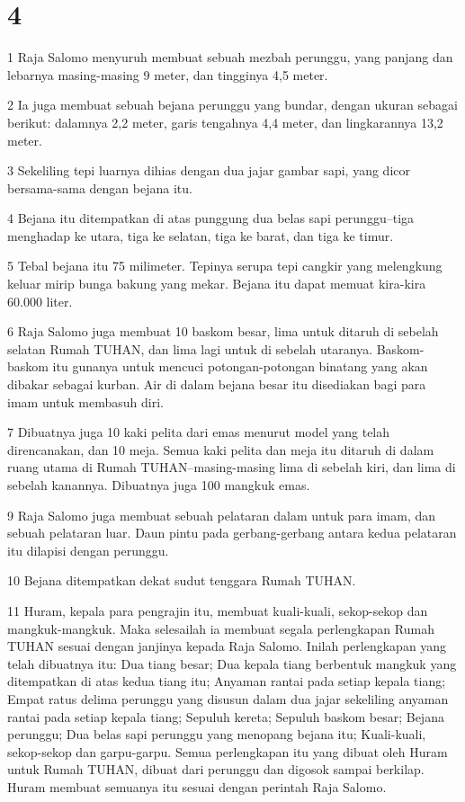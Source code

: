 \chapter{4}

\par 1 Raja Salomo menyuruh membuat sebuah mezbah perunggu, yang panjang dan lebarnya masing-masing 9 meter, dan tingginya 4,5 meter.
\par 2 Ia juga membuat sebuah bejana perunggu yang bundar, dengan ukuran sebagai berikut: dalamnya 2,2 meter, garis tengahnya 4,4 meter, dan lingkarannya 13,2 meter.
\par 3 Sekeliling tepi luarnya dihias dengan dua jajar gambar sapi, yang dicor bersama-sama dengan bejana itu.
\par 4 Bejana itu ditempatkan di atas punggung dua belas sapi perunggu--tiga menghadap ke utara, tiga ke selatan, tiga ke barat, dan tiga ke timur.
\par 5 Tebal bejana itu 75 milimeter. Tepinya serupa tepi cangkir yang melengkung keluar mirip bunga bakung yang mekar. Bejana itu dapat memuat kira-kira 60.000 liter.
\par 6 Raja Salomo juga membuat 10 baskom besar, lima untuk ditaruh di sebelah selatan Rumah TUHAN, dan lima lagi untuk di sebelah utaranya. Baskom-baskom itu gunanya untuk mencuci potongan-potongan binatang yang akan dibakar sebagai kurban. Air di dalam bejana besar itu disediakan bagi para imam untuk membasuh diri.
\par 7 Dibuatnya juga 10 kaki pelita dari emas menurut model yang telah direncanakan, dan 10 meja. Semua kaki pelita dan meja itu ditaruh di dalam ruang utama di Rumah TUHAN--masing-masing lima di sebelah kiri, dan lima di sebelah kanannya. Dibuatnya juga 100 mangkuk emas.
\par 9 Raja Salomo juga membuat sebuah pelataran dalam untuk para imam, dan sebuah pelataran luar. Daun pintu pada gerbang-gerbang antara kedua pelataran itu dilapisi dengan perunggu.
\par 10 Bejana ditempatkan dekat sudut tenggara Rumah TUHAN.
\par 11 Huram, kepala para pengrajin itu, membuat kuali-kuali, sekop-sekop dan mangkuk-mangkuk. Maka selesailah ia membuat segala perlengkapan Rumah TUHAN sesuai dengan janjinya kepada Raja Salomo. Inilah perlengkapan yang telah dibuatnya itu: Dua tiang besar; Dua kepala tiang berbentuk mangkuk yang ditempatkan di atas kedua tiang itu; Anyaman rantai pada setiap kepala tiang; Empat ratus delima perunggu yang disusun dalam dua jajar sekeliling anyaman rantai pada setiap kepala tiang; Sepuluh kereta; Sepuluh baskom besar; Bejana perunggu; Dua belas sapi perunggu yang menopang bejana itu; Kuali-kuali, sekop-sekop dan garpu-garpu. Semua perlengkapan itu yang dibuat oleh Huram untuk Rumah TUHAN, dibuat dari perunggu dan digosok sampai berkilap. Huram membuat semuanya itu sesuai dengan perintah Raja Salomo.
